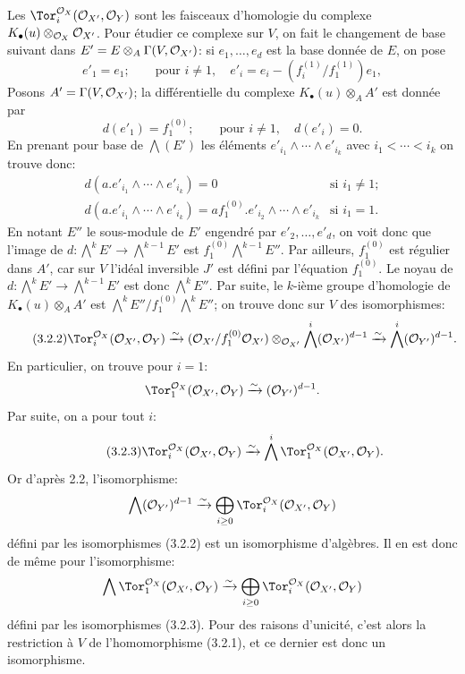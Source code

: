 Les \(\Tor_i^{\cO_X}(\cO_{X'},\cO_Y)\) sont les faisceaux d'homologie du complexe \(K_\bullet(u)\otimes_{\mathcal O_X}\mathcal O_{X'}\). Pour étudier ce complexe sur \(V\), on fait le changement de base suivant dans \(E'=E\otimes_A\Gamma(V,\mathcal O_{X'})\): si \(e_1,\ldots,e_d\) est la base donnée de \(E\), on pose
\[
e'_1=e_1;\qquad \text{pour }i\ne1,\quad
e'_i=e_i-(f_i^{(1)}/f_1^{(1)})e_1,
\]
Posons \(A'=\Gamma(V,\mathcal O_{X'})\); la différentielle du complexe \(K_\bullet(u)\otimes_A A'\) est donnée par
\[
d(e'_1)=f_1^{(0)};\qquad \text{pour }i\ne1,\quad d(e'_i)=0.
\]
En prenant pour base de \(\bigwedge(E')\) les éléments
\(e'_{i_1}\wedge\cdots\wedge e'_{i_k}\) avec \(i_1<\cdots<i_k\) on trouve donc:
\[
\begin{array}{ll}
d(a.e'_{i_1}\wedge\cdots\wedge e'_{i_k})=0
&\text{si }i_1\ne1;\\[3pt]
d(a.e'_{i_1}\wedge\cdots\wedge e'_{i_k})=
af_1^{(0)}.e'_{i_2}\wedge\cdots\wedge e'_{i_k}
&\text{si }i_1=1.
\end{array}
\]
En
notant \(E''\) le sous-module de \(E'\) engendré par \(e'_2,\ldots,e'_d\), on voit donc que l'image de \(d:\bigwedge^kE'\longrightarrow\bigwedge^{k-1}E'\) est \(f_1^{(0)}\bigwedge^{k-1}E''\). Par ailleurs, \(f_1^{(0)}\) est régulier dans \(A'\), car sur \(V\) l'idéal inversible \(J'\) est défini par l'équation \(f_1^{(0)}\). Le noyau de \(d:\bigwedge^kE'\longrightarrow\bigwedge^{k-1}E'\) est donc \(\bigwedge^kE''\). Par suite, le \(k\)-ième groupe d'homologie de \(K_\bullet(u)\otimes_AA'\) est \(\bigwedge^kE''/f_1^{(0)}\bigwedge^kE''\); on trouve donc sur \(V\) des isomorphismes:
\begin{equation}\tag{3.2.2}
\Tor_i^{\cO_X}(\cO_{X'},\cO_Y)
\xrightarrow{\sim}
(\cO_{X'}/f_1^{(0)}\cO_{X'})\otimes_{\cO_{X'}}
\bigwedge^i(\cO_{X'})^{d-1}
\xrightarrow{\sim}
\bigwedge^i(\cO_{Y'})^{d-1}.
\end{equation}
En particulier, on trouve pour \(i=1\):
\[
\Tor_1^{\cO_X}(\cO_{X'},\cO_Y)
\xrightarrow{\sim}
(\cO_{Y'})^{d-1}.
\]
Par suite, on a pour tout \(i\):
\begin{equation}\tag{3.2.3}
\Tor_i^{\cO_X}(\cO_{X'},\cO_Y)
\xrightarrow{\sim}
\bigwedge^i\Tor_1^{\cO_X}(\cO_{X'},\cO_Y).
\end{equation}
Or d'après 2.2, l'isomorphisme:
\[
\bigwedge(\cO_{Y'})^{d-1}
\xrightarrow{\sim}
\bigoplus_{i\ge0}\Tor_i^{\cO_X}(\cO_{X'},\cO_Y)
\]
défini par les isomorphismes (3.2.2) est un isomorphisme d'algèbres. Il en est donc de même pour l'isomorphisme:
\[
\bigwedge\Tor_1^{\cO_X}(\cO_{X'},\cO_Y)
\xrightarrow{\sim}
\bigoplus_{i\ge0}\Tor_i^{\cO_X}(\cO_{X'},\cO_Y)
\]
défini par les isomorphismes (3.2.3). Pour des raisons d'unicité, c'est alors la restriction à \(V\) de l'homomorphisme (3.2.1), et ce dernier est donc un isomorphisme.

